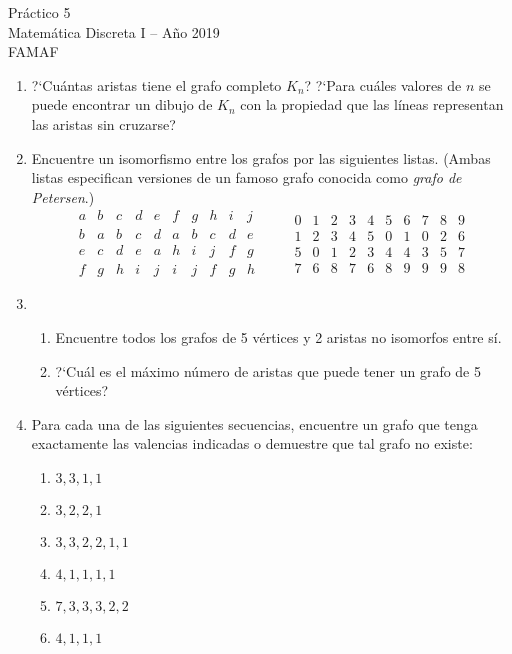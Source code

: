 \documentclass[12pt,spanish,makeidx]{amsbook}
\theoremstyle{definition}
\theoremstyle{remark}
\begin{document}
{\bf \begin{center} Práctico 5 \\ Matemática Discreta I -- Año 2019 \\ FAMAF \end{center}}

\medskip




\begin{enumerate}

\item  ?`Cuántas aristas tiene el  grafo completo $K_n$? ?`Para
cuáles valores de $n$ se puede encontrar un dibujo de $K_n$ con la
propiedad que las l\'ineas representan las aristas sin cruzarse?


\medskip
\item Encuentre un isomorfismo entre los grafos por las siguientes
listas. (Ambas listas especifican versiones de un famoso grafo
conocida como {\it grafo de Petersen}.)
$$
\begin{matrix}
a&b&c&d&e&f&g&h&i&j\\ \hline
b&a&b&c&d&a&b&c&d&e\\
e&c&d&e&a&h&i&j&f&g\\
f&g&h&i&j&i&j&f&g&h
\end{matrix}
\qquad \begin{matrix}
0&1&2&3&4&5&6&7&8&9\\ \hline
1&2&3&4&5&0&1&0&2&6\\
5&0&1&2&3&4&4&3&5&7\\
7&6&8&7&6&8&9&9&9&8
\end{matrix}
$$

\medskip
\item
\begin{enumerate}
\item Encuentre todos los grafos de 5 vértices y 2 aristas no isomorfos entre sí.
 \item ?`Cuál es el máximo número de aristas que puede tener un grafo de 5 vértices?
\end{enumerate}

\medskip

\item Para cada una de las siguientes secuencias, encuentre un grafo que tenga exactamente las valencias indicadas o demuestre
que tal grafo no existe:
\begin{multicols}{3}
\begin{enumerate}
\item $3,3,1,1$
\item $3,2,2,1$
\item $3,3,2,2,1,1$
\item $4,1,1,1,1$
\item $7,3,3,3,2,2$
\item $4,1,1,1$
\end{enumerate}
\end{multicols}


\end{enumerate}
\end{document}
